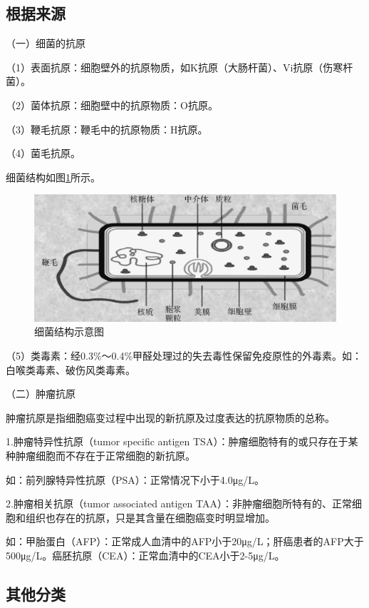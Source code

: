 \subsection{根据来源}

（一）细菌的抗原

（1）表面抗原：细胞壁外的抗原物质，如K抗原（大肠杆菌）、Vi抗原（伤寒杆菌）。

（2）菌体抗原：细胞壁中的抗原物质：O抗原。

（3）鞭毛抗原：鞭毛中的抗原物质：H抗原。

（4）菌毛抗原。

细菌结构如图\ref{fig3-9}所示。

\begin{figure}[!htbp]
 \centering
 \includegraphics{./images/Image00058.jpg}
 \captionsetup{justification=centering}
 \caption{细菌结构示意图}
 \label{fig3-9}
  \end{figure}

（5）类毒素：经0.3\%～0.4\%甲醛处理过的失去毒性保留免疫原性的外毒素。如：白喉类毒素、破伤风类毒素。

（二）肿瘤抗原

肿瘤抗原是指细胞癌变过程中出现的新抗原及过度表达的抗原物质的总称。

1.肿瘤特异性抗原（tumor specific antigen
TSA）：肿瘤细胞特有的或只存在于某种肿瘤细胞而不存在于正常细胞的新抗原。

如：前列腺特异性抗原（PSA）：正常情况下小于4.0μg/L。

2.肿瘤相关抗原（tumor associated antigen
TAA）：非肿瘤细胞所特有的、正常细胞和组织也存在的抗原，只是其含量在细胞癌变时明显增加。

如：甲胎蛋白（AFP）：正常成人血清中的AFP小于20μg/L；肝癌患者的AFP大于500μg/L。癌胚抗原（CEA）：正常血清中的CEA小于2-5μg/L。


\subsection{其他分类}


